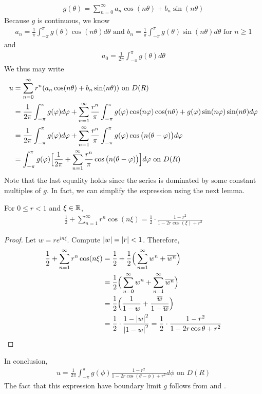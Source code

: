 \documentclass{report}
\begin{document}
\begin{mdframed}
\begin{align*}
g(\theta)= \sum_{n=0}^{\infty} a_n \cos (n \theta)+ b_n \sin (n \theta)
\end{align*}
Because $g$ is continuous, we know 
\begin{align*}
a_n= \frac{1}{\pi }\int_{-\pi }^{\pi } g(\theta)\cos (n \theta) d\theta \text{ and }b_n = \frac{1}{\pi }\int_{-\pi }^{\pi }g(\theta)\sin (n \theta)d \theta \text{ for }n\geq 1
\end{align*}
and 
\begin{align*}
a_0= \frac{1}{2\pi }\int_{-\pi }^{\pi }g(\theta) d\theta
\end{align*}
We thus may write 
\begin{align}
\label{lk2}
u&=\sum_{n=0}^{\infty} r^n (a_n \cos (n\theta)+b_n \sin (n \theta))\text{ on }D(R)\\
&=  \frac{1}{2\pi }\int_{-\pi }^{\pi }g(\phi)d\phi +\sum_{n=1}^{\infty} \frac{r^n}{\pi } \int_{-\pi }^{\pi } g(\phi) \cos (n\phi)\cos (n \theta) + g(\phi) \sin (n \phi)\sin (n \theta)d \phi \notag  \\
&= \frac{1}{2\pi }\int_{-\pi }^{\pi }g(\phi)d\phi + \sum_{n=1}^{\infty} \frac{r^n}{\pi }\int_{-\pi }^{\pi }g(\phi) \cos \big(n (\theta- \phi)\big)  d\phi\notag  \\
&=\int_{-\pi }^{\pi }g(\phi) \Big[\frac{1}{2 \pi  }+\sum_{n=1}^{\infty} \frac{r^n}{\pi }\cos \big( n (\theta- \phi) \big) \Big]d\phi \text{ on }D(R)\notag 
\end{align}
Note that the last equality holds since the series is dominated by some constant multiples of $g$.    In fact, we can simplify the expression using the next lemma. 
\end{mdframed}
\begin{lemma}
For $0\leq r<1$ and $\xi\in\mathbb{R}$, 
\begin{align*}
\frac{1}{2}+\sum_{n=1}^{\infty} r^n \cos ( n \xi)=  \frac{1}{2}\cdot \frac{1-r^2}{1-2r \cos (\xi) + r^2}
\end{align*}
\end{lemma}
\begin{proof}
Let $w=re^{i n \xi}$. Compute $\left|w\right|=\left|r\right|<1$. Therefore, 
\begin{align*}
\frac{1}{2}+\sum_{n=1}^{\infty} r^n \cos ( n \xi) &=\frac{1}{2}+ \frac{1}{2}\Big(\sum_{n=1}^{\infty} w^n +\overline{w^n}  \Big) \\
&=\frac{1}{2}\Big( \sum_{n=0}^{\infty}w^n + \sum_{n=1}^{\infty} \overline{w^n} \Big) \\
&=\frac{1}{2}\Big( \frac{1}{1-w}+ \frac{\overline{w}}{1- \overline{w}} \Big)\\
&= \frac{1}{2}\cdot \frac{1- \left|w\right|^2}{ \left|1-w\right|^2}= \frac{1}{2} \cdot \frac{1-r^2}{1-2r \cos \theta + r^2}
\end{align*}
\end{proof}
\begin{mdframed}
In conclusion, 
\begin{align*}
u= \frac{1}{2\pi }\int_{-\pi }^{\pi } g(\phi) \frac{1-r^2}{1-2r \cos (\theta- \phi)+r^2}d \phi \text{ on }D(R)
\end{align*}
The fact that this expression have boundary limit $g$ follows from  and . 
\end{mdframed}
\end{document}
